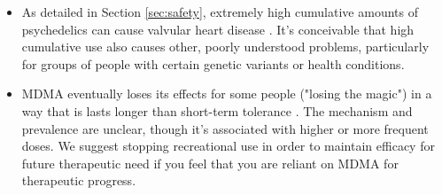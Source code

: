 \documentclass[12pt,letterpaper]{book}
\begin{document}
\begin{itemize}
    \item As detailed in Section \ref{sec:safety}, extremely high cumulative amounts of psychedelics can cause valvular heart disease \cite{droogmans2007valvular,tagen2023valvular}. It's conceivable that high cumulative use also causes other, poorly understood problems, particularly for groups of people with certain genetic variants or health conditions.
    \item MDMA eventually loses its effects for some people ("losing the magic") in a way that is lasts longer than short-term tolerance \cite{farreTolerance,parrottTolerance}. The mechanism and prevalence are unclear, though it's associated with higher or more frequent doses. We suggest stopping recreational use in order to maintain efficacy for future therapeutic need if you feel that you are reliant on MDMA for therapeutic progress.
\end{itemize}
\end{document}
